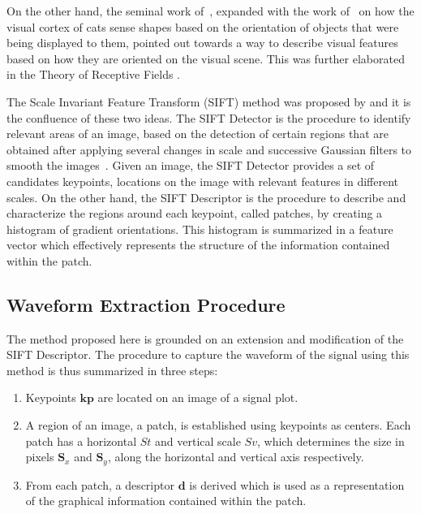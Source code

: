 \documentclass[review]{elsarticle}
\begin{document}
On the other hand, the seminal work of~\citep{HUBEL1965}, expanded with the work of~\cite{Edelman1997} on how the visual cortex of cats sense shapes based on the orientation of objects that were being displayed to them, pointed out towards a way to describe visual features based on how they are oriented on the visual scene.  This was further elaborated in the Theory of Receptive Fields \cite{Linde2012,Lindeberg2013}.

The Scale Invariant Feature Transform (SIFT) method was proposed by \citep{Lowe2004} and it is the confluence of these two ideas.  The SIFT Detector is the procedure to identify relevant areas of an image, based on the detection of certain regions that are obtained after applying several changes in scale and successive Gaussian filters to smooth the images~\cite{Rey-Otero2014,Szeliski2010}.  Given an image, the SIFT Detector provides a set of candidates keypoints, locations on the image with relevant features in different scales.   On the other hand, the SIFT Descriptor is the procedure to describe and characterize the regions around each keypoint, called patches, by creating a histogram of gradient orientations.  This histogram is summarized in a feature vector which effectively represents the structure of the information contained within the patch.   


\subsection{Waveform Extraction Procedure}

The method proposed here is grounded on an extension and modification of the SIFT Descriptor.  The procedure to capture the waveform of the signal using this method is thus summarized in three steps:

\begin{enumerate}
\item Keypoints $\mathbf{kp}$ are located on an image of a signal plot.
\item A region of an image, a patch, is established using keypoints as centers.  Each patch has a horizontal $St$ and vertical scale $Sv$, which determines the size in pixels $\mathbf{S}_x$ and $\mathbf{S}_y$,  along the horizontal and vertical axis respectively. 
\item From each patch, a descriptor $\mathbf{d}$ is derived which is used as a representation of the graphical information contained within the patch.
\end{enumerate}
\end{document}
